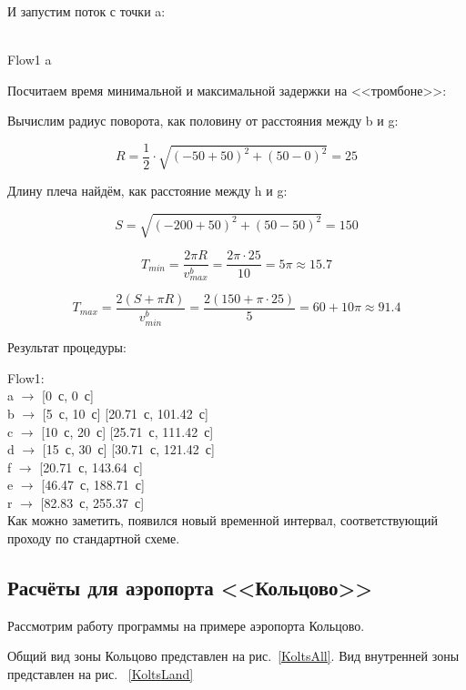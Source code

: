 \documentclass[12pt]{article}
\theoremstyle{plain}
\begin{document}
И запустим поток с точки a:

\\
Flow1 a

Посчитаем время минимальной и максимальной задержки на <<тромбоне>>:

Вычислим радиус поворота, как половину от расстояния между b и g:

$$
 R = \frac{1}{2} \cdot \sqrt{(-50 + 50)^2 + (50 - 0)^2} = 25
$$

Длину плеча найдём, как расстояние между h и g:

$$
S = \sqrt{(-200 + 50)^2 + (50 - 50)^2} = 150
$$

$$
T_{min} = \frac{2 \pi R}{v_{max}^b} = \frac{2 \pi \cdot 25}{10} = 5\pi \approx 15.7
$$

$$
T_{max} = \frac{2(S + \pi R)}{v_{min}^b} = \frac{2(150 + \pi \cdot 25)}{5} = 60 + 10\pi \approx 91.4
$$

Результат процедуры:

\noindent Flow1:\\
a $\rightarrow$ [0~с, 0~с]\\
b $\rightarrow$ [5~с, 10~с] [20.71~с, 101.42~с]\\
c $\rightarrow$ [10~с, 20~с] [25.71~с, 111.42~с]\\
d $\rightarrow$ [15~с, 30~с] [30.71~с, 121.42~с]\\
f $\rightarrow$ [20.71~с, 143.64~с]\\
e $\rightarrow$ [46.47~с, 188.71~с]\\
r $\rightarrow$ [82.83~с, 255.37~с]\\


Как можно заметить, появился новый временной интервал, соответствующий проходу по стандартной схеме.

\newpage



\subsection{Расчёты для аэропорта <<Кольцово>>}

Рассмотрим работу программы на примере аэропорта Кольцово.

Общий вид зоны Кольцово представлен на рис.~\ref{KoltsAll}. Вид внутренней зоны представлен на рис.~ \ref{KoltsLand}
\end{document}
